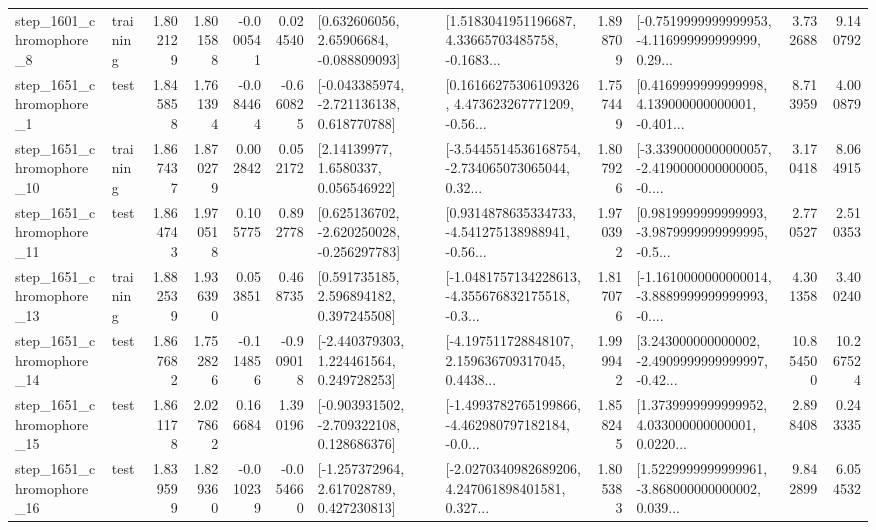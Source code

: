 \begin{tabular}{llrrrrllrlrr}
  step\_1601\_chromophore\_8 &  training &      1.802129 &    1.801588 &     -0.000541 &  0.024540 &     [0.632606056, 2.65906684, -0.088809093] &  [1.5183041951196687, 4.33665703485758, -0.1683... &       1.898709 &  [-0.7519999999999953, -4.116999999999999, 0.29... &            3.732688 &          9.140792 \\
  step\_1651\_chromophore\_1 &      test &      1.845858 &    1.761394 &     -0.084464 & -0.660825 &   [-0.043385974, -2.721136138, 0.618770788] &  [0.16166275306109326, 4.473623267771209, -0.56... &       1.757449 &  [0.4169999999999998, 4.139000000000001, -0.401... &            8.713959 &          4.000879 \\
 step\_1651\_chromophore\_10 &  training &      1.867437 &    1.870279 &      0.002842 &  0.052172 &        [2.14139977, 1.6580337, 0.056546922] &  [-3.5445514536168754, -2.734065073065044, 0.32... &       1.807926 &  [-3.3390000000000057, -2.4190000000000005, -0.... &            3.170418 &          8.064915 \\
 step\_1651\_chromophore\_11 &      test &      1.864743 &    1.970518 &      0.105775 &  0.892778 &   [0.625136702, -2.620250028, -0.256297783] &  [0.9314878635334733, -4.541275138988941, -0.56... &       1.970392 &  [0.9819999999999993, -3.9879999999999995, -0.5... &            2.770527 &          2.510353 \\
 step\_1651\_chromophore\_13 &  training &      1.882539 &    1.936390 &      0.053851 &  0.468735 &     [0.591735185, 2.596894182, 0.397245508] &  [-1.0481757134228613, -4.355676832175518, -0.3... &       1.817076 &  [-1.1610000000000014, -3.8889999999999993, -0.... &            4.301358 &          3.400240 \\
 step\_1651\_chromophore\_14 &      test &      1.867682 &    1.752826 &     -0.114856 & -0.909018 &    [-2.440379303, 1.224461564, 0.249728253] &  [-4.197511728848107, 2.159636709317045, 0.4438... &       1.999942 &  [3.243000000000002, -2.4909999999999997, -0.42... &           10.854500 &         10.267524 \\
 step\_1651\_chromophore\_15 &      test &      1.861178 &    2.027862 &      0.166684 &  1.390196 &   [-0.903931502, -2.709322108, 0.128686376] &  [-1.4993782765199866, -4.462980797182184, -0.0... &       1.858245 &  [1.3739999999999952, 4.033000000000001, 0.0220... &            2.898408 &          0.243335 \\
 step\_1651\_chromophore\_16 &      test &      1.839599 &    1.829360 &     -0.010239 & -0.054660 &    [-1.257372964, 2.617028789, 0.427230813] &  [-2.0270340982689206, 4.247061898401581, 0.327... &       1.805383 &  [1.5229999999999961, -3.868000000000002, 0.039... &            9.842899 &          6.054532 \\

\end{tabular}
